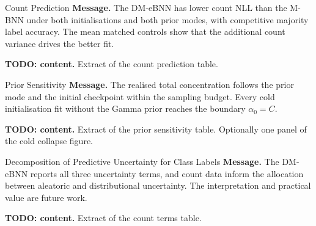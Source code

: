 \begin{frame}{Count Prediction}
	\textbf{Message.} The DM-eBNN has lower count NLL than the M-BNN under both initialisations and both prior modes, with competitive majority label accuracy. The mean matched controls show that the additional count variance drives the better fit.

	\medskip
	\textbf{TODO: content.} Extract of the count prediction table.
\end{frame}

\begin{frame}{Prior Sensitivity}
	\textbf{Message.} The realised total concentration follows the prior mode and the initial checkpoint within the sampling budget. Every cold initialisation fit without the Gamma prior reaches the boundary $\alpha_0 = C$.

	\medskip
	\textbf{TODO: content.} Extract of the prior sensitivity table. Optionally one panel of the cold collapse figure.
\end{frame}

\begin{frame}{Decomposition of Predictive Uncertainty for Class Labels}
	\textbf{Message.} The DM-eBNN reports all three uncertainty terms, and count data inform the allocation between aleatoric and distributional uncertainty. The interpretation and practical value are future work.

	\medskip
	\textbf{TODO: content.} Extract of the count terms table.
\end{frame}
